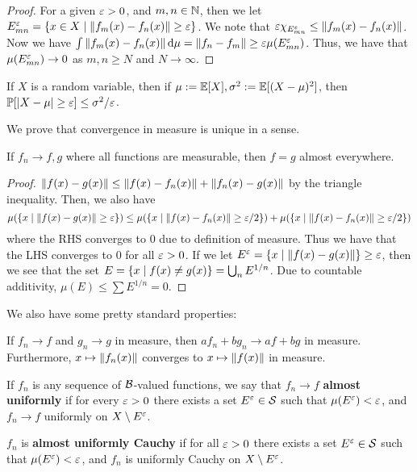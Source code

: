 \begin{proof}
    For a given $\varepsilon > 0$, and $m,n \in \mathbb N$, then we let $E_{mn}^\varepsilon = \qty{x \in X \mid \norm{f_m(x) - f_n(x)} \ge \varepsilon}$. We note that $\varepsilon \chi_{E_{mn}^\varepsilon} \le \norm{f_m(x) - f_n(x)}$. Now we have $\int \norm{f_m(x) - f_n(x)} \dd{\mu} = \norm{f_n - f_m} \ge \varepsilon\mu(E_{mn}^\varepsilon)$. Thus, we have that $\mu(E_{mn}^\varepsilon) \to 0$ as $m, n \ge N$ and $N \to \infty$.
\end{proof}

\begin{corollary}
    If $X$ is a random variable, then if $\mu := \mathbb E[X], \sigma^2 := \mathbb E[(X - \mu)^2]$, then $\mathbb P[\abs{X - \mu} \ge \varepsilon] \le \sigma^2/\varepsilon$.
\end{corollary}

We prove that convergence in measure is unique in a sense.

\begin{proposition}
    If $f_n \to f, g$ where all functions are measurable, then $f = g$ almost everywhere.
\end{proposition}

\begin{proof}
    $\norm{f(x) - g(x)} \le \norm{f(x) - f_n(x)} + \norm{f_n(x) - g(x)}$ by the triangle inequality. Then, we also have \[\mu(\qty{x \mid \norm{f(x) - g(x)} \ge \varepsilon}) \le \mu\qty(\qty{x \mid \norm{f(x) - f_n(x)} \ge \varepsilon/2}) + \mu\qty(\qty{x \mid \norm{f(x) - f_n(x)} \ge \varepsilon/2})\] where the RHS converges to $0$ due to definition of measure. Thus we have that the LHS converges to $0$ for all $\varepsilon > 0$. If we let $E^\varepsilon = \qty{x \mid \norm{f(x) - g(x)}} \ge \varepsilon$, then we see that the set $E = \qty{x \mid f(x) \ne g(x)} = \bigcup_n E^{1/n}$. Due to countable additivity, $\mu(E) \le \sum E^{1/n} = 0$.
\end{proof}

We also have some pretty standard properties:

\begin{proposition}
    If $f_n \to f$ and $g_n \to g$ in measure, then $af_n + bg_n \to af + bg$ in measure. Furthermore, $x \mapsto \norm{f_n(x)}$ converges to $x \mapsto \norm{f(x)}$ in measure.
\end{proposition}

\begin{definition}
    If $f_n$ is any sequence of $\mathcal B$-valued functions, we say that $f_n \to f$ \textbf{almost uniformly} if for every $\varepsilon > 0$ there exists a set $E^\varepsilon \in \mathcal S$ such that $\mu(E^\varepsilon) < \varepsilon$, and $f_n \to f$ uniformly on $X \setminus E^\varepsilon$.

    $f_n$ is \textbf{almost uniformly Cauchy} if for all $\varepsilon > 0$ there exists a set $E^\varepsilon \in \mathcal S$ such that $\mu(E^\varepsilon) < \varepsilon$, and $f_n$ is uniformly Cauchy on $X \setminus E^\varepsilon$.
\end{definition}


